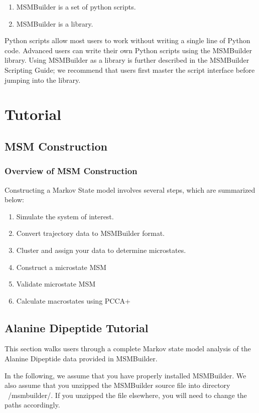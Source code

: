 \documentclass[12pt]{article}
\begin{document}
\begin{enumerate}
\item MSMBuilder is a set of python scripts.  
\item MSMBuilder is a library.
\end{enumerate}

Python scripts allow most users to work without writing a single line of Python code.  Advanced users can write their own Python scripts using the MSMBuilder library.  Using MSMBuilder as a library is further described in the MSMBuilder Scripting Guide; we recommend that users first master the script interface before jumping into the library.  

\newpage

\section{Tutorial}
\subsection{MSM Construction}

\subsubsection{Overview of MSM Construction}
Constructing a Markov State model involves several steps, which are summarized below:
\begin{enumerate}
 \item Simulate the system of interest.
 \item Convert trajectory data to MSMBuilder format.
 \item Cluster and assign your data to determine microstates.
 \item Construct a microstate MSM
 \item Validate microstate MSM
 \item Calculate macrostates using PCCA+
\end{enumerate}

\subsection{Alanine Dipeptide Tutorial}

This section walks users through a complete Markov state model analysis of the Alanine Dipeptide data provided in MSMBuilder.

In the following, we assume that you have properly installed MSMBuilder.  We also assume that you unzipped the MSMBuilder source file into directory ~/msmbuilder/.  If you unzipped the file elsewhere, you will need to change the paths accordingly.  
\end{document}
